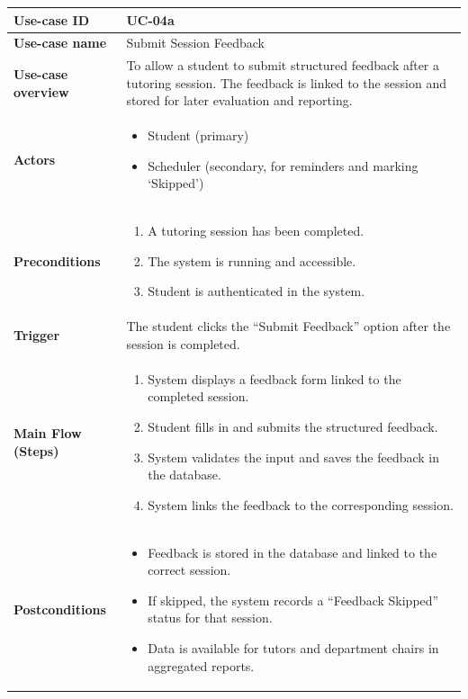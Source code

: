 \begin{table}[H]
\centering
\renewcommand{\arraystretch}{1.3}
\begin{tabular}{|p{3cm}|p{11cm}|}
\hline
\textbf{Use-case ID} & UC-04a \\ 
\hline
\textbf{Use-case name} & Submit Session Feedback \\ 
\hline
\textbf{Use-case overview} & To allow a student to submit structured feedback after a tutoring session. The feedback is linked to the session and stored for later evaluation and reporting. \\ 
\hline
\textbf{Actors} & 
\begin{itemize}
    \item Student (primary)
    \item Scheduler (secondary, for reminders and marking ‘Skipped’)
\end{itemize} \\ 
\hline
\textbf{Preconditions} & 
\begin{enumerate}
    \item A tutoring session has been completed.
    \item The system is running and accessible.
    \item Student is authenticated in the system.
\end{enumerate} \\ 
\hline
\textbf{Trigger} & The student clicks the ``Submit Feedback'' option after the session is completed. \\ 
\hline
\textbf{Main Flow (Steps)} & 
\begin{enumerate}
    \item System displays a feedback form linked to the completed session.
    \item Student fills in and submits the structured feedback.
    \item System validates the input and saves the feedback in the database.
    \item System links the feedback to the corresponding session.
\end{enumerate} \\ 
\hline
\textbf{Postconditions} & 
\begin{itemize}
    \item Feedback is stored in the database and linked to the correct session.
    \item If skipped, the system records a ``Feedback Skipped'' status for that session.
    \item Data is available for tutors and department chairs in aggregated reports.

\end{itemize}
\end{tabular}
\end{table}
